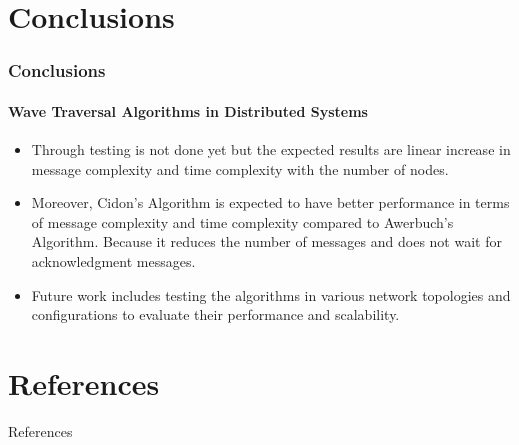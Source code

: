 \documentclass[11pt]{beamer}              %
\begin{document}
\section{Conclusions}
\begin{frame}
\frametitle{Conclusions}
\framesubtitle{Wave Traversal Algorithms in Distributed Systems}
\begin{itemize}
    \item Through testing is not done yet but the expected results are linear increase in message complexity and time complexity  with the number of nodes.
    \item Moreover, Cidon's Algorithm is expected to have better performance in terms of message complexity and time complexity compared to Awerbuch's Algorithm. Because it reduces the number of messages and does not wait for acknowledgment messages.
    \item Future work includes testing the algorithms in various network topologies and configurations to evaluate their performance and scalability.
\end{itemize}

\end{frame}

\section*{References}
\begin{frame}{References}


\nocite{*} %
\end{frame}


\thankslide
\end{document}

